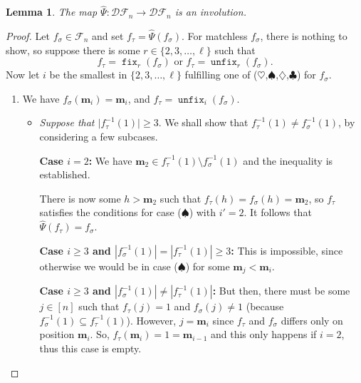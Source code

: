 \documentclass[reqno]{amsart}
\newtheorem{lemma}[theorem]{Lemma}
\theoremstyle{definition}
\newcommand{\SEF}{\mathcal{F}}  %
\newcommand{\DSEF}{\mathcal{DF}}%
\newcommand{\fretherD}{\hat{\Psi}}
\newcommand{\caseOne}{\ensuremath{\heartsuit}}
\newcommand{\caseTwo}{\ensuremath{\spadesuit}}
\newcommand{\caseThree}{\ensuremath{\diamondsuit}}
\newcommand{\caseFour}{\ensuremath{\clubsuit}}
\newcommand{\img}{\mathbf{m}}
\DeclareMathOperator{\fixMap}{\mathtt{fix}}
\DeclareMathOperator{\unfixMap}{\mathtt{unfix}}
\begin{document}
\begin{lemma}\label{lem:involution}
	The map $\fretherD:\DSEF_n\longrightarrow \DSEF_n$
	is an involution.
\end{lemma}
\begin{proof}
	Let $f_\sigma\in \SEF_n$ and set
	$f_\tau=\fretherD(f_\sigma)$. For matchless $f_\sigma$, there is nothing to show,
	so suppose there is some $r \in \{2,3,\dotsc, \ell\}$ such that
	\[
	f_\tau=\fixMap_r(f_\sigma) \text{ or } f_\tau=\unfixMap_r(f_\sigma).
	\]
Now let $i$ be the smallest in $\{2,3,\dotsc, \ell\}$
fulfilling one of (\caseOne,\caseTwo,\caseThree,\caseFour) for $f_\sigma$.
	
\begin{enumerate}[leftmargin=1.6cm]
 	\item[\textbf{Case \caseOne:}] 
 	  We have $f_\sigma(\img_i)=\img_i$, 
 	  and $f_\tau=\unfixMap_i(f_\sigma)$.
		
		\begin{itemize}[leftmargin=-1cm]
			\item
			\emph{Suppose that $\vert f_\tau^{-1}(1)\vert \geq 3$}.
			We shall show that $f_\tau^{-1}(1) \neq f_\sigma^{-1}(1)$,
			by considering a few subcases.
			
			\medskip 
			\noindent 
			\textbf{Case $i=2$:}
			We  have $\img_2\in f_\tau^{-1}(1) \setminus f_\sigma^{-1}(1)$
			and the inequality is established.
			
		  There is now some $h>\img_2$ such that $f_\tau(h)=f_\sigma(h)=\img_2$,
		  so $f_\tau$ satisfies the conditions for case (\caseTwo) with $i'=2$. 
			It follows that $\fretherD(f_\tau)=f_\sigma$.
			
			\medskip 
			\noindent 
			\textbf{Case $i\geq 3$ and $|f_\sigma^{-1}(1)| = | f_\tau^{-1}(1)| \geq 3$:}
			This is impossible, since otherwise
			we would be in case (\caseTwo) for some $\img_j < \img_i$.
			
			\medskip 
			\noindent 
			\textbf{Case $i\geq 3$ and $|f_\sigma^{-1}(1)| \neq | f_\tau^{-1}(1)|$:} 
			But then, there must be some $j\in [n]$ such that $f_\tau(j) = 1$ and $f_\sigma(j)\neq 1$
			(because $f_\sigma^{-1}(1) \subseteq  f_\tau^{-1}(1)$). However, $j=\img_i$ since $f_\tau$ and $f_\sigma$ differs
			only on position $\img_i$. So, $f_\tau(\img_i)=1=\img_{i-1}$  and this only happens if $i=2$,
			thus this case is empty.
			
			\medskip
			

\end{itemize}
\end{enumerate}
\end{proof}
\end{document}
